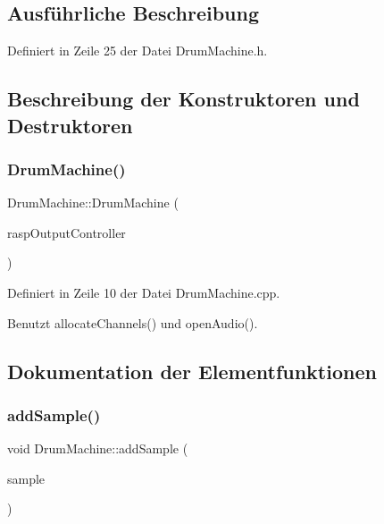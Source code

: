 \subsection{Ausführliche Beschreibung}


Definiert in Zeile 25 der Datei Drum\+Machine.\+h.



\subsection{Beschreibung der Konstruktoren und Destruktoren}
\mbox{\label{class_drum_machine_a2b038c37477e742bd3ce70e7f7bb6af5}} 
\subsubsection{\texorpdfstring{Drum\+Machine()}{DrumMachine()}}
{\footnotesize\ttfamily Drum\+Machine\+::\+Drum\+Machine (\begin{DoxyParamCaption}\item[{\hyperlink{class_a_output_controller}{A\+Output\+Controller} \&}]{rasp\+Output\+Controller }\end{DoxyParamCaption})\hspace{0.3cm}{\ttfamily [explicit]}}



Definiert in Zeile 10 der Datei Drum\+Machine.\+cpp.



Benutzt allocate\+Channels() und open\+Audio().



\subsection{Dokumentation der Elementfunktionen}
\mbox{\label{class_drum_machine_a530ac2c3529492c62a01619786fb3765}} 
\subsubsection{\texorpdfstring{add\+Sample()}{addSample()}}
{\footnotesize\ttfamily void Drum\+Machine\+::add\+Sample (\begin{DoxyParamCaption}\item[{\hyperlink{class_sample}{Sample}}]{sample }\end{DoxyParamCaption})}



